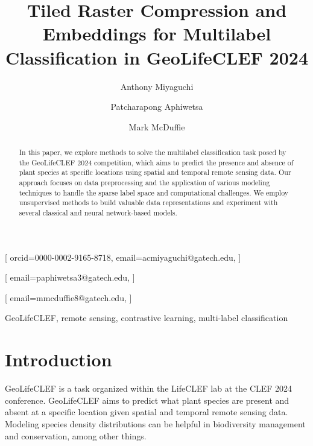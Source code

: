 \documentclass[]{style/ceurart}
\begin{document}


\title{Tiled Raster Compression and Embeddings for Multilabel Classification in GeoLifeCLEF 2024}

\author[1]{Anthony Miyaguchi}[
orcid=0000-0002-9165-8718,
email=acmiyaguchi@gatech.edu,
]
\cormark[1]
\author[1]{Patcharapong Aphiwetsa}[
email=paphiwetsa3@gatech.edu,
]
\author[1]{Mark McDuffie}[
email=mmcduffie8@gatech.edu,
]

\address[1]{Georgia Institute of Technology, North Ave NW, Atlanta, GA 30332}

\begin{abstract}
In this paper, we explore methods to solve the multilabel classification task posed by the GeoLifeCLEF 2024 competition, which aims to predict the presence and absence of plant species at specific locations using spatial and temporal remote sensing data. 
Our approach focuses on data preprocessing and the application of various modeling techniques to handle the sparse label space and computational challenges. 
We employ unsupervised methods to build valuable data representations and experiment with several classical and neural network-based models.
\end{abstract}

\begin{keywords}
  GeoLifeCLEF,
  remote sensing,
  contrastive learning,
  multi-label classification
\end{keywords}


\maketitle

\section{Introduction}

GeoLifeCLEF is a task organized within the LifeCLEF lab at the CLEF 2024 conference. 
GeoLifeCLEF aims to predict what plant species are present and absent at a specific location given spatial and temporal remote sensing data. 
Modeling species density distributions can be helpful in biodiversity management and conservation, among other things.
\end{document}
